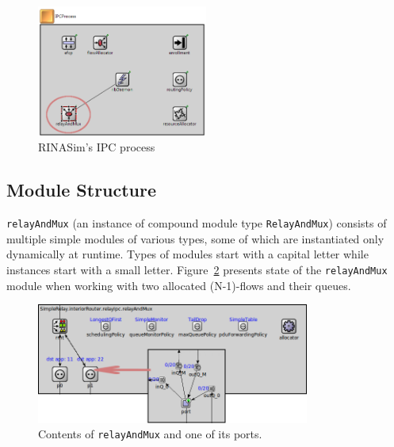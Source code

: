         \begin{figure}[H]
                \begin{center}
                    \includegraphics[width=0.5\textwidth]{fig/impl_rinasim-ipcp.png}
                  \caption{RINASim's IPC process}
                  \label{fig:rinasim:ipcp}
                \end{center}
            \end{figure}

        \subsection{Module Structure}

            \texttt{relayAndMux} (an instance of compound module type \texttt{RelayAndMux}) consists of multiple simple modules of various types, some of which are instantiated only dynamically at runtime. Types of modules start with a capital letter while instances start with a small letter. Figure~\ref{fig:rinasim:rmt} presents state of the \texttt{relayAndMux} module when working with two allocated (N-1)-flows and their queues.

            \begin{figure}[H]
                \begin{center}
                    \includegraphics[width=0.8\textwidth]{fig/impl_rinasim-rmt.png}
                  \caption{Contents of \texttt{relayAndMux} and one of its ports.}
                  \label{fig:rinasim:rmt}
                \end{center}
            \end{figure}

